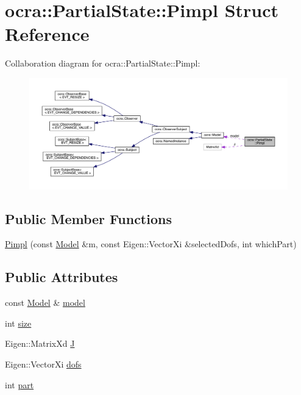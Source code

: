 \hypertarget{structocra_1_1PartialState_1_1Pimpl}{}\section{ocra\+:\+:Partial\+State\+:\+:Pimpl Struct Reference}
\label{structocra_1_1PartialState_1_1Pimpl}


Collaboration diagram for ocra\+:\+:Partial\+State\+:\+:Pimpl\+:\nopagebreak
\begin{figure}[H]
\begin{center}
\leavevmode
\includegraphics[width=350pt]{dd/df3/structocra_1_1PartialState_1_1Pimpl__coll__graph}
\end{center}
\end{figure}
\subsection*{Public Member Functions}
\begin{DoxyCompactItemize}
\item 
\hyperlink{structocra_1_1PartialState_1_1Pimpl_a4f12abe2e984af1d293d847dc3456724}{Pimpl} (const \hyperlink{classocra_1_1Model}{Model} \&m, const Eigen\+::\+Vector\+Xi \&selected\+Dofs, int which\+Part)
\end{DoxyCompactItemize}
\subsection*{Public Attributes}
\begin{DoxyCompactItemize}
\item 
const \hyperlink{classocra_1_1Model}{Model} \& \hyperlink{structocra_1_1PartialState_1_1Pimpl_a45e5572b9e9cbe6ac2d9ba4107a58bd6}{model}
\item 
int \hyperlink{structocra_1_1PartialState_1_1Pimpl_ac60f12a932c9bac309b2c1794de57a9c}{size}
\item 
Eigen\+::\+Matrix\+Xd \hyperlink{structocra_1_1PartialState_1_1Pimpl_a7c31cf81faa6abbbe780b9f143094418}{J}
\item 
Eigen\+::\+Vector\+Xi \hyperlink{structocra_1_1PartialState_1_1Pimpl_a206c2d1097d24706e5bf2d3a9b0862a8}{dofs}
\item 
int \hyperlink{structocra_1_1PartialState_1_1Pimpl_a605a55abed1d170fa6911088fefa7337}{part}
\end{DoxyCompactItemize}


